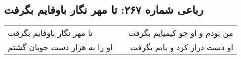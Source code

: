 \begin{center}
\section*{رباعی شماره ۲۶۷: تا مهر نگار باوفایم بگرفت}
\label{sec:0267}
\begin{longtable}{l p{0.5cm} r}
تا مهر نگار باوفایم بگرفت
&&
من بودم و او چو کیمیایم بگرفت
\\
او را به هزار دست جویان گشتم
&&
او دست دراز کرد و پایم بگرفت
\\
\end{longtable}
\end{center}
